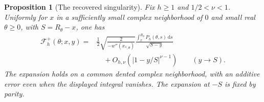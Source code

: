 \documentclass[a4paper,10pt]{article}
\numberwithin{equation}{section}
\newcommand{\dd}{\mathrm{d}}
\theoremstyle{paperplain}
\newtheorem{prp}[thm]{Proposition}
\theoremstyle{paperremark}
\theoremstyle{paperplain}
\begin{document}
\begin{prp}[The recovered singularity]\label{prp:s08:recovered-singularity}
Fix $h\geq1$ and $1/2<\nu<1$. Uniformly for $x$ in a sufficiently
small complex neighborhood of $0$ and small real $\theta\geq0$,
with $S=R_\theta-x$, one has
\begin{equation}\label{eq:s08:recovered-singularity}
 \begin{aligned}
 \mathcal F_h^+(\theta;x,y)
 ={}&\frac{1}{2}\sqrt{\frac{2}{-w''(x_{*,\theta})}}
       \frac{\displaystyle\int_x^{R_\theta}P_h(\theta,s)\,\dd s}
            {\sqrt{S-y}}\\
 &\quad+O_{h,\nu}(|1-y/S|^{\nu-1})
                         \qquad(y\longrightarrow S).
 \end{aligned}
\end{equation}
The expansion holds on a common dented complex neighborhood, with
an additive error even when the displayed integral vanishes.
The expansion at $-S$ is fixed by parity.
\end{prp}
\end{document}
